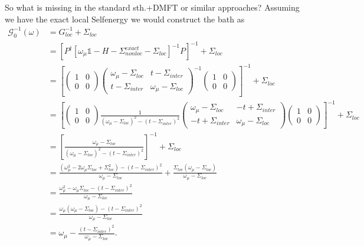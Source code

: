 \documentclass[12pt,a4paper]{scrartcl}
\numberwithin{equation}{section}
\newcommand{\unity}{\mathds{1}}
\begin{document}
So what is missing in the standard sth.+DMFT or similar approaches?
Assuming we have the exact local Selfenergy we would construct the bath as
\begin{align}
 \mathcal{G}_0^{-1}(\omega) 
 &= G_{loc}^{-1} + \Sigma_{loc} \\
 &= \left[ P^{\dagger} \left[  \omega_{\mu}\unity - H - \Sigma^{exact}_{nonloc} - \Sigma_{loc} \right]^{-1} P\right]^{-1} +  \Sigma_{loc} \nonumber \\
 &= \left[
 \begin{pmatrix}
     1 & 0 \\ 0 & 0
    \end{pmatrix}
   \begin{pmatrix}
     \omega_{\mu}-\Sigma_{loc} & t-\Sigma_{inter} \\ t-\Sigma_{inter}  & \omega_{\mu}-\Sigma_{loc}
    \end{pmatrix}^{-1}
    \begin{pmatrix}
     1 & 0 \\ 0 & 0
    \end{pmatrix} 
\right]^{-1} +  \Sigma_{loc}  \nonumber\\
%
&= \left[
 \begin{pmatrix}
     1 & 0 \\ 0 & 0
    \end{pmatrix}
    \frac{1}{(\omega_{\mu}-\Sigma_{loc})^{2} -(t-\Sigma_{inter})^2 }
   \begin{pmatrix}
     \omega_{\mu}-\Sigma_{loc} & -t+\Sigma_{inter} \\ -t+\Sigma_{inter}  & \omega_{\mu}-\Sigma_{loc}
    \end{pmatrix} 
    \begin{pmatrix}
     1 & 0 \\ 0 & 0
    \end{pmatrix} 
\right]^{-1} +  \Sigma_{loc}  \nonumber\\
%
&= \left[
    \frac{\omega_{\mu}-\Sigma_{loc}}{(\omega_{\mu}-\Sigma_{loc})^{2} -(t-\Sigma_{inter})^2 }
\right]^{-1} +  \Sigma_{loc}  \nonumber\\
%
&= \frac{(\omega_{\mu}^2 -2\omega_{\mu}\Sigma_{loc}+\Sigma_{loc}^2 ) -(t-\Sigma_{inter})^2 }{\omega_{\mu}-\Sigma_{loc}}
 +  \frac{\Sigma_{loc}(\omega_{\mu}-\Sigma_{loc})}{\omega_{\mu}-\Sigma_{loc}}  \nonumber\\
 &= \frac{\omega_{\mu}^2 -\omega_{\mu}\Sigma_{loc}  -(t-\Sigma_{inter})^2 }{\omega_{\mu}-\Sigma_{loc}} \nonumber\\
 &= \frac{\omega_{\mu} ( \omega_{\mu}- \Sigma_{loc})  -(t-\Sigma_{inter})^2 }{\omega_{\mu}-\Sigma_{loc}} \nonumber\\
 &= \omega_{\mu} - \frac{ (t-\Sigma_{inter})^2 }{\omega_{\mu}-\Sigma_{loc}} .
\end{align}
\end{document}
